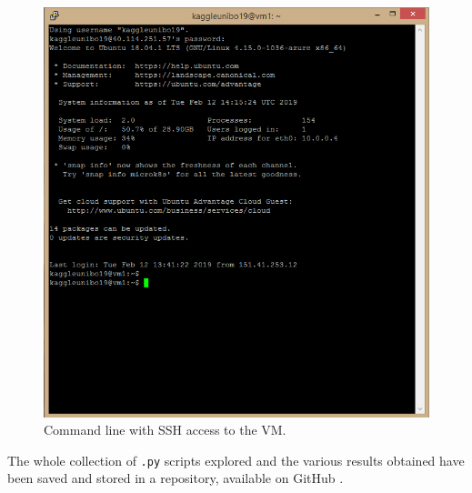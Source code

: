 \begin{figure} [h]
	\centering
	\includegraphics[width=0.7\linewidth]{pictures/cmd.png}
	\caption{Command line with SSH access to the VM.}
	\label{fig:cmd}
\end{figure}

The whole collection of \texttt{.py} scripts explored and the various results obtained have been saved and stored in a repository, available on GitHub \cite{github}.